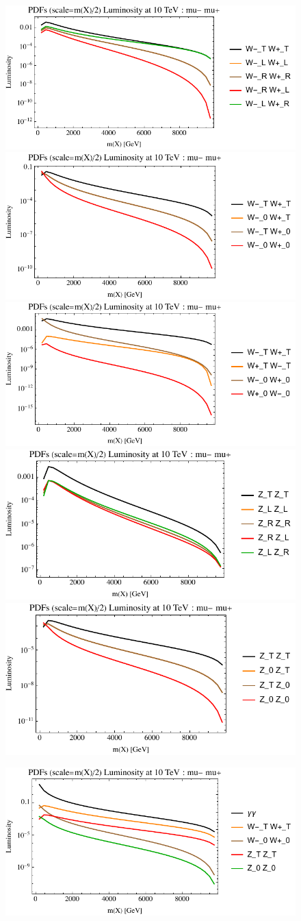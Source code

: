 \documentclass[a4paper,11pt]{article}
\begin{document}
\begin{figure}[ht]
\includegraphics[width=0.46\linewidth]{PlotLumi/10TeV/lumis/plotWWpolRandL.pdf}
\includegraphics[width=0.46\linewidth]{PlotLumi/10TeV/lumis/plotWWpolTand0.pdf}
\includegraphics[width=0.46\linewidth]{PlotLumi/10TeV/lumis/plotWmWpandWpWm.pdf}
\includegraphics[width=0.46\linewidth]{PlotLumi/10TeV/lumis/plotZZpolRandL.pdf}
\includegraphics[width=0.46\linewidth]{PlotLumi/10TeV/lumis/plotZZpolTand0.pdf}
\end{figure}

\begin{figure}
\includegraphics[width=0.46\linewidth]{PlotLumi/10TeV/lumis/plotgammaWZ.pdf}
\end{figure}
\end{document}
